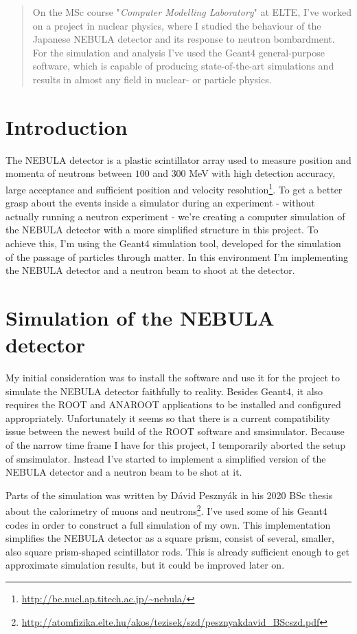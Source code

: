 \begin{abstract}
	On the MSc course "\textit{Computer Modelling Laboratory}" at ELTE, I've worked on a project in nuclear physics, where I studied the behaviour of the Japanese NEBULA detector and its response to neutron bombardment. For the simulation and analysis I've used the Geant4 general-purpose software, which is capable of producing state-of-the-art simulations and results in almost any field in nuclear- or particle physics.
\end{abstract}

\begin{multicols}{2}
\section{Introduction}
The NEBULA detector is a plastic scintillator array used to measure position and momenta of neutrons between $100$ and $300$ MeV with high detection accuracy, large acceptance and sufficient position and velocity resolution\footnote{\url{http://be.nucl.ap.titech.ac.jp/~nebula/}}. To get a better grasp about the events inside a simulator during an experiment - without actually running a neutron experiment - we're creating a computer simulation of the NEBULA detector with a more simplified structure in this project. To achieve this, I'm using the Geant4 simulation tool, developed for the simulation of the passage of particles through matter. In this environment I'm implementing the NEBULA detector and a neutron beam to shoot at the detector.

\section{Simulation of the NEBULA detector}
My initial consideration was to install the software  and use it for the project to simulate the NEBULA detector faithfully to reality. Besides Geant4, it also requires the ROOT and ANAROOT applications to be installed and configured appropriately. Unfortunately it seems so that there is a current compatibility issue between the newest build of the ROOT software and smsimulator. Because of the narrow time frame I have for this project, I temporarily aborted the setup of smsimulator. Instead I've started to implement a simplified version of the NEBULA detector and a neutron beam to be shot at it.

Parts of the simulation was written by Dávid Pesznyák in his 2020 BSc thesis about the calorimetry of muons and neutrons\footnote{\url{http://atomfizika.elte.hu/akos/tezisek/szd/pesznyakdavid_BScszd.pdf}}. I've used some of his Geant4 codes in order to construct a full simulation of my own. This implementation simplifies the NEBULA detector as a square prism, consist of several, smaller, also square prism-shaped scintillator rods. This is already sufficient enough to get approximate simulation results, but it could be improved later on.


\end{multicols}

